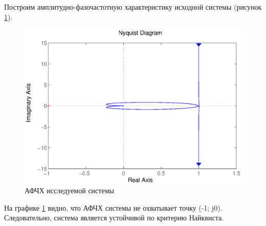 \documentclass[a4paper,12pt]{article} %
\begin{document}
Построим амплитудно-фазочастотную характеристику исходной системы (рисунок \ref{nyquist}).\par
\begin{figure}[H]
	\centering
	\includegraphics[width=0.9\linewidth]{scheme/nyquist}
	\caption{АФЧХ исследуемой системы}
	\label{nyquist}
\end{figure}
На графике \ref{nyquist} видно, что АФЧХ системы не охватывает точку (-1; j0). Следовательно, система является устойчивой по критерию Найквиста.

\newpage
\end{document}
